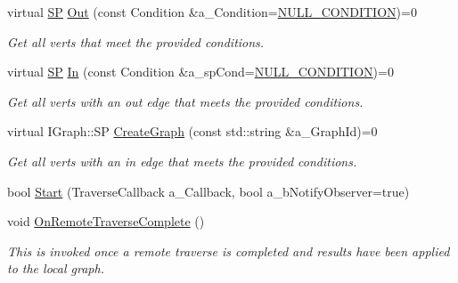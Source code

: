 \begin{DoxyCompactItemize}
\mbox{\label{class_i_graph_1_1_i_traverser_ae559752d97e7e19fc29f3d98c8eb4a6c}} 
virtual \hyperlink{class_i_graph_1_1_i_traverser_a5a5ccc81423d6024742d1898a310d812}{SP} \hyperlink{class_i_graph_1_1_i_traverser_ae559752d97e7e19fc29f3d98c8eb4a6c}{Out} (const Condition \&a\+\_\+\+Condition=\hyperlink{class_i_graph_af5f1100a2f9d5a6f7e795bd7b2d642a4}{N\+U\+L\+L\+\_\+\+C\+O\+N\+D\+I\+T\+I\+ON})=0
\begin{DoxyCompactList}\small\item\em Get all verts that meet the provided conditions. \end{DoxyCompactList}\item 
\mbox{\label{class_i_graph_1_1_i_traverser_a46312057c0b40c61ea59b3e0bf90cbec}} 
virtual \hyperlink{class_i_graph_1_1_i_traverser_a5a5ccc81423d6024742d1898a310d812}{SP} \hyperlink{class_i_graph_1_1_i_traverser_a46312057c0b40c61ea59b3e0bf90cbec}{In} (const Condition \&a\+\_\+sp\+Cond=\hyperlink{class_i_graph_af5f1100a2f9d5a6f7e795bd7b2d642a4}{N\+U\+L\+L\+\_\+\+C\+O\+N\+D\+I\+T\+I\+ON})=0
\begin{DoxyCompactList}\small\item\em Get all verts with an out edge that meets the provided conditions. \end{DoxyCompactList}\item 
virtual I\+Graph\+::\+SP \hyperlink{class_i_graph_1_1_i_traverser_ac6ce6b5258a3ef06297b5b91b87bbf00}{Create\+Graph} (const std\+::string \&a\+\_\+\+Graph\+Id)=0
\begin{DoxyCompactList}\small\item\em Get all verts with an in edge that meets the provided conditions. \end{DoxyCompactList}\item 
bool \hyperlink{class_i_graph_1_1_i_traverser_ab7995bf2c010898ca3bfb92e4318f8de}{Start} (Traverse\+Callback a\+\_\+\+Callback, bool a\+\_\+b\+Notify\+Observer=true)
\item 
\mbox{\label{class_i_graph_1_1_i_traverser_a0bc6c0d37022d91136917e5a6450dd11}} 
void \hyperlink{class_i_graph_1_1_i_traverser_a0bc6c0d37022d91136917e5a6450dd11}{On\+Remote\+Traverse\+Complete} ()
\begin{DoxyCompactList}\small\item\em This is invoked once a remote traverse is completed and results have been applied to the local graph. \end{DoxyCompactList}\end{DoxyCompactItemize}
